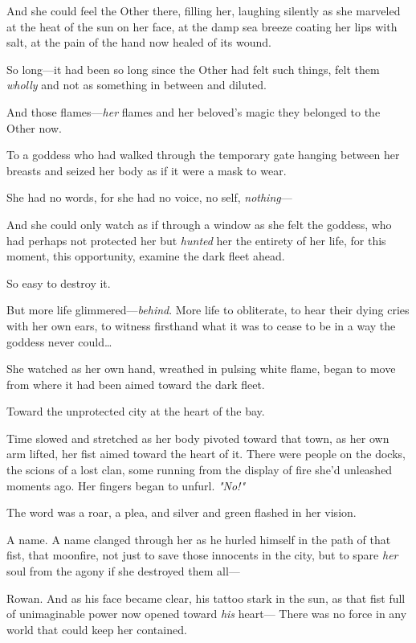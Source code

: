 And she could feel the Other there, filling her, laughing silently as she marveled at the heat of the sun on her face, at the damp sea breeze coating her lips with salt, at the pain of the hand now healed of its wound.

So long---it had been so long since the Other had felt such things, felt them \emph{wholly} and not as something in between and diluted.

And those flames---\emph{her} flames and her beloved's magic 
they belonged to the Other now.

To a goddess who had walked through the temporary gate hanging between her breasts and seized her body as if it were a mask to wear.

She had no words, for she had no voice, no self, \emph{nothing}---

And she could only watch as if through a window as she felt the goddess, who had perhaps not protected her but \emph{hunted} her the entirety of her life, for this moment, this opportunity, examine the dark fleet ahead.

So easy to destroy it.

But more life glimmered---\emph{behind}.
More life to obliterate, to hear their dying cries with her own ears, to witness firsthand what it was to cease to be in a way the goddess never could\ldots{}

She watched as her own hand, wreathed in pulsing white flame, began to move from where it had been aimed toward the dark fleet.

Toward the unprotected city at the heart of the bay.

Time slowed and stretched as her body pivoted toward that town, as her own arm lifted, her fist aimed toward the heart of it.
There were people on the docks, the scions of a lost clan, some running from the display of fire she'd unleashed moments ago.
Her fingers began to unfurl.
\emph{"No!"}

The word was a roar, a plea, and silver and green flashed in her vision.

A name.
A name clanged through her as he hurled himself in the path of that fist, that moonfire, not just to save those innocents in the city, but to spare \emph{her} soul from the agony if she destroyed them all---

Rowan.
And as his face became clear, his tattoo stark in the sun, as that fist full of unimaginable power now opened toward \emph{his}
heart--- There was no force in any world that could keep her contained.

